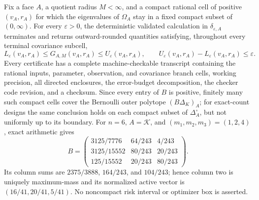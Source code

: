 Fix a face \(A\), a quotient radius \(M<\infty\), and a compact rational cell of positive \((v_A,r_A)\) for which the eigenvalues of \(\Omega_A\) stay in a fixed compact subset of \((0,\infty)\).  For every \(\varepsilon>0\), the deterministic validated calculation in \(\delta_{\varepsilon,A}\) terminates and returns outward-rounded quantities satisfying, throughout every terminal covariance subcell,
\[
L_\varepsilon(v_A,r_A)\leq G_{A,M}(v_A,r_A)\leq U_\varepsilon(v_A,r_A),
\qquad U_\varepsilon(v_A,r_A)-L_\varepsilon(v_A,r_A)\leq\varepsilon.
\]
Every certificate has a complete machine-checkable transcript containing the rational inputs, parameter, observation, and covariance branch cells, working precision, all directed enclosures, the error-budget decomposition, the checker code revision, and a checksum.  Since every entry of \(B\) is positive, finitely many such compact cells cover the Bernoulli outer polytope \((B\Delta_K)_A\); for exact-count designs the same conclusion holds on each compact subset of \(\Delta_A^\circ\), but not uniformly up to its boundary.  For \(n=6\), \(A=\mathcal K\), and \((m_1,m_2,m_3)=(1,2,4)\), exact arithmetic gives
\[
B=\begin{pmatrix}3125/7776&64/243&4/243\\3125/15552&80/243&20/243\\125/15552&20/243&80/243\end{pmatrix}.
\]
Its column sums are \(2375/3888\), \(164/243\), and \(104/243\); hence column two is uniquely maximum-mass and its normalized active vector is \((16/41,20/41,5/41)\).  No noncompact risk interval or optimizer box is asserted.